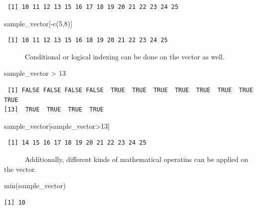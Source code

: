 \documentclass[
  letterpaper,
  DIV=11,
  numbers=noendperiod]{scrreprt}
\newenvironment{Shaded}{\begin{snugshade}}{\end{snugshade}}
\newcommand{\DecValTok}[1]{\textcolor[rgb]{0.68,0.00,0.00}{#1}}
\newcommand{\FunctionTok}[1]{\textcolor[rgb]{0.28,0.35,0.67}{#1}}
\newcommand{\NormalTok}[1]{\textcolor[rgb]{0.00,0.23,0.31}{#1}}
\newcommand{\SpecialCharTok}[1]{\textcolor[rgb]{0.37,0.37,0.37}{#1}}
\begin{document}
\begin{verbatim}
 [1] 10 11 12 13 15 16 17 18 19 20 21 22 23 24 25
\end{verbatim}

\begin{Shaded}
\begin{Highlighting}[]
\NormalTok{sample\_vector[}\SpecialCharTok{{-}}\FunctionTok{c}\NormalTok{(}\DecValTok{5}\NormalTok{,}\DecValTok{8}\NormalTok{)]}
\end{Highlighting}
\end{Shaded}

\begin{verbatim}
 [1] 10 11 12 13 15 16 18 19 20 21 22 23 24 25
\end{verbatim}

~~~~~~Conditional or logical indexing can be done on the vector as well.

\begin{Shaded}
\begin{Highlighting}[]
\NormalTok{sample\_vector }\SpecialCharTok{\textgreater{}} \DecValTok{13}
\end{Highlighting}
\end{Shaded}

\begin{verbatim}
 [1] FALSE FALSE FALSE FALSE  TRUE  TRUE  TRUE  TRUE  TRUE  TRUE  TRUE  TRUE
[13]  TRUE  TRUE  TRUE  TRUE
\end{verbatim}

\begin{Shaded}
\begin{Highlighting}[]
\NormalTok{sample\_vector[sample\_vector}\SpecialCharTok{\textgreater{}}\DecValTok{13}\NormalTok{]}
\end{Highlighting}
\end{Shaded}

\begin{verbatim}
 [1] 14 15 16 17 18 19 20 21 22 23 24 25
\end{verbatim}

~~~~~~Additionally, different kinds of mathematical operatins can be
applied on the vector.

\begin{Shaded}
\begin{Highlighting}[]
\FunctionTok{min}\NormalTok{(sample\_vector)}
\end{Highlighting}
\end{Shaded}

\begin{verbatim}
[1] 10
\end{verbatim}
\end{document}
